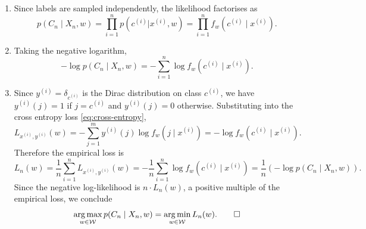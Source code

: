 \documentclass[11pt]{article}
\DeclareMathOperator*{\argmin}{arg\,min}
\DeclareMathOperator*{\argmax}{arg\,max}
\newcommand{\W}{\mathcal{W}}
\begin{document}
\begin{solution}
\begin{enumerate}
    \item
        Since labels are sampled independently, the likelihood factorises as
        \begin{equation*}
            p(C_n \mid X_n, w)
            = \prod_{i=1}^n p(c^{(i)} | x^{(i)}, w)
            = \prod_{i=1}^n f_w(c^{(i)} \mid x^{(i)}).
        \end{equation*}

    \item
        Taking the negative logarithm,
        \begin{equation*}
            -\log p(C_n \mid X_n, w)
            = -\sum_{i=1}^n \log f_w(c^{(i)} \mid x^{(i)}).
        \end{equation*}

    \item
        Since $y^{(i)} = \delta_{c^{(i)}}$ is the Dirac distribution on class
        $c^{(i)}$, we have $y^{(i)}(j) = 1$ if $j = c^{(i)}$ and $y^{(i)}(j)
        = 0$ otherwise. Substituting into the cross entropy loss
        \eqref{eq:cross-entropy},
        \begin{equation*}
            L_{x^{(i)},y^{(i)}}(w)
            = -\sum_{j=1}^m y^{(i)}(j) \log f_w(j \mid x^{(i)})
            = -\log f_w(c^{(i)} \mid x^{(i)}).
        \end{equation*}
        Therefore the empirical loss is
        \begin{equation*}
            L_n(w)
            = \frac{1}{n}\sum_{i=1}^n L_{x^{(i)},y^{(i)}}(w)
            = -\frac{1}{n}\sum_{i=1}^n \log f_w(c^{(i)} \mid x^{(i)})
            = \frac{1}{n}\left(-\log p(C_n \mid X_n, w)\right).
        \end{equation*}
        Since the negative log-likelihood is $n \cdot L_n(w)$, a positive
        multiple of the empirical loss, we conclude
        \begin{equation*}
            \argmax_{w\in\W} p(C_n \mid X_n, w)
            = \argmin_{w\in\W} L_n(w). \qedhere
        \end{equation*}
\end{enumerate}
\end{solution}
\end{document}
